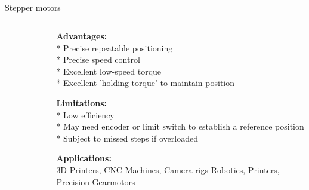 \subsection{}
{
\begin{frame}{Stepper motors}

\begin{columns}
\begin{column}{0.45\textwidth}  %

	\vspace{-3mm}
   	\begin{figure}
 	\end{figure}

\end{column}

\begin{column}{0.55\textwidth}

{\bf Advantages:} \\
* Precise repeatable positioning \\
* Precise speed control \\
* Excellent low-speed torque \\
* Excellent 'holding torque' to maintain position


{\bf Limitations:} \\
* Low efficiency \\
* May need encoder or limit switch to establish a reference position \\
* Subject to missed steps if overloaded


{\bf Applications:} \\
3D Printers, 
CNC Machines, 
Camera rigs Robotics, 
Printers, 
Precision Gearmotors






\end{column}
\end{columns}
\end{frame}
}






